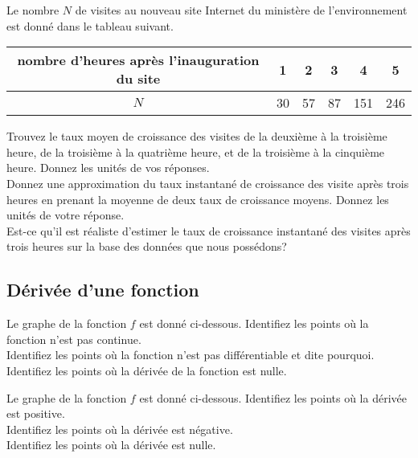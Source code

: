 \begin{question}
Le nombre $N$ de visites au nouveau site Internet du ministère de
l'environnement est donné dans le tableau suivant.
\begin{center}
\begin{tabular}{c|c|c|c|c|c}
nombre d'heures après l'inauguration du site & 1 & 2 & 3 & 4 & 5 \\
\hline
$N$ & 30 & 57 & 87 & 151 & 246
\end{tabular}
\end{center}

 Trouvez le taux moyen de croissance des visites de la
deuxième à la troisième heure, de la troisième à la quatrième heure,
et de la troisième à la cinquième heure.  Donnez les unités de vos
réponses.\\
 Donnez une approximation du taux instantané de croissance des
visite après trois heures en prenant la moyenne de deux taux de
croissance moyens. Donnez les unités de votre réponse.\\
 Est-ce qu'il est réaliste d'estimer le taux de croissance
instantané des visites après trois heures sur la base des données que
nous possédons?
\label{5Q5}
\end{question}

\subsection{Dérivée d'une fonction}

\begin{question}
Le graphe de la fonction $f$ est donné ci-dessous.
 Identifiez les points où la fonction n'est pas continue.\\
 Identifiez les points où la fonction n'est pas différentiable
et dite pourquoi.\\
 Identifiez les points où la dérivée de la fonction est nulle.
\label{5Q6}
\end{question}

\begin{question}
Le graphe de la fonction $f$ est donné ci-dessous.
 Identifiez les points où la dérivée est positive.\\
 Identifiez les points où la dérivée est négative.\\
 Identifiez les points où la dérivée est nulle.
\label{5Q7}
\end{question}

